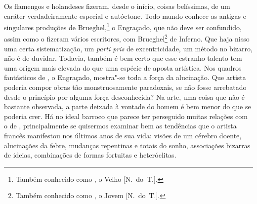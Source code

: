 \sectionitem

Os flamengos e holandeses fizeram, desde o início, coisas belíssimas, de
um caráter verdadeiramente especial e autóctone. Todo mundo conhece as
antigas e singulares produções de Brueghel,\footnote{ Também conhecido
como , o Velho [N.~do~T.].} o Engraçado, que não deve ser
confundido, assim como o fizeram vários escritores, com
Brueghel\footnote{ Também conhecido como , o Jovem [N.~do~T.].} de Inferno. Que haja nisso uma certa sistematização, um
\textit{parti pris} de excentricidade, um método no bizarro, não é de
duvidar. Todavia, também é bem certo que esse estranho talento tem uma
origem mais elevada do que uma espécie de aposta artística. Nos quadros
fantásticos de , o Engraçado, mostra"-se toda a força da
alucinação. Que artista poderia compor obras tão monstruosamente
paradoxais, se não fosse arrebatado desde o princípio por alguma força
desconhecida? Na arte, uma coisa que não é bastante observada, a parte
deixada à vontade do homem é bem menor do que se poderia crer. Há no
ideal barroco que  parece ter perseguido muitas relações com o
de , principalmente se quisermos examinar bem as
tendências que o artista francês manifestou nos últimos anos de sua
vida: visões de um cérebro doente, alucinações da febre, mudanças
repentinas e totais do sonho, associações bizarras de ideias,
combinações de formas fortuitas e heteróclitas.

